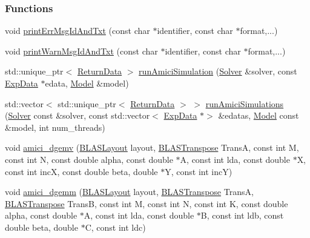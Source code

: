 \subsubsection*{Functions}
\begin{DoxyCompactItemize}
\item 
void \mbox{\hyperlink{namespaceamici_ade28c6a7f1b5aee40bb2453fb61b4024}{print\+Err\+Msg\+Id\+And\+Txt}} (const char $\ast$identifier, const char $\ast$format,...)
\item 
void \mbox{\hyperlink{namespaceamici_a14122f73594a970df27bfcb8fa0db35d}{print\+Warn\+Msg\+Id\+And\+Txt}} (const char $\ast$identifier, const char $\ast$format,...)
\item 
std\+::unique\+\_\+ptr$<$ \mbox{\hyperlink{classamici_1_1_return_data}{Return\+Data}} $>$ \mbox{\hyperlink{namespaceamici_a46331a204e7511587acc2cc0b1ce7ed0}{run\+Amici\+Simulation}} (\mbox{\hyperlink{classamici_1_1_solver}{Solver}} \&solver, const \mbox{\hyperlink{classamici_1_1_exp_data}{Exp\+Data}} $\ast$edata, \mbox{\hyperlink{classamici_1_1_model}{Model}} \&model)
\item 
std\+::vector$<$ std\+::unique\+\_\+ptr$<$ \mbox{\hyperlink{classamici_1_1_return_data}{Return\+Data}} $>$ $>$ \mbox{\hyperlink{namespaceamici_a76e08fb9dd88a6b5352ae53d7afedc1e}{run\+Amici\+Simulations}} (\mbox{\hyperlink{classamici_1_1_solver}{Solver}} const \&solver, const std\+::vector$<$ \mbox{\hyperlink{classamici_1_1_exp_data}{Exp\+Data}} $\ast$$>$ \&edatas, \mbox{\hyperlink{classamici_1_1_model}{Model}} const \&model, int num\+\_\+threads)
\item 
void \mbox{\hyperlink{namespaceamici_aaadff5ccb22e546f3590e15f5ee30c1c}{amici\+\_\+dgemv}} (\mbox{\hyperlink{namespaceamici_a3ec6460bb4e7f6100a15d18627a3ff3e}{B\+L\+A\+S\+Layout}} layout, \mbox{\hyperlink{namespaceamici_a0f0ec77c6c8f48d9c5cb50d54899afae}{B\+L\+A\+S\+Transpose}} TransA, const int M, const int N, const double alpha, const double $\ast$A, const int lda, const double $\ast$X, const int incX, const double beta, double $\ast$Y, const int incY)
\item 
void \mbox{\hyperlink{namespaceamici_a235c0cbd2185cc7351ea9c126e498bd9}{amici\+\_\+dgemm}} (\mbox{\hyperlink{namespaceamici_a3ec6460bb4e7f6100a15d18627a3ff3e}{B\+L\+A\+S\+Layout}} layout, \mbox{\hyperlink{namespaceamici_a0f0ec77c6c8f48d9c5cb50d54899afae}{B\+L\+A\+S\+Transpose}} TransA, \mbox{\hyperlink{namespaceamici_a0f0ec77c6c8f48d9c5cb50d54899afae}{B\+L\+A\+S\+Transpose}} TransB, const int M, const int N, const int K, const double alpha, const double $\ast$A, const int lda, const double $\ast$B, const int ldb, const double beta, double $\ast$C, const int ldc)
$$
\end{DoxyCompactItemize}
